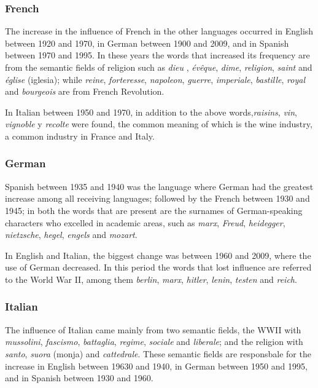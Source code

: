 \documentclass[10pt,letterpaper]{article} %
\begin{document}
	\subsubsection*{French} %
	
	The increase in the influence of French in the other languages occurred in English between 1920 and 1970, in German between 1900 and 2009, and in Spanish between 1970 and 1995. In these years the words that increased its frequency are from the semantic fields of religion such as \textit{dieu} , \textit{évêque}, \textit{dime}, \textit{religion}, \textit{saint} and \textit{église} (iglesia); while \textit{reine}, \textit{forteresse}, \textit{napoleon}, \textit{guerre}, \textit{imperiale}, \textit{bastille}, \textit{royal} and \textit{bourgeois} are from French Revolution.
	
	In Italian between 1950 and 1970, in addition to the above words,\textit{raisins}, \textit{vin}, \textit{vignoble} y \textit{recolte} were found, the common meaning of which is the wine industry, a common industry in France and Italy.
	
	\subsubsection*{German} %
	
	Spanish between 1935 and 1940 was the language where German had the greatest increase among all receiving languages; followed by the French between 1930 and 1945; in both  the words that are present are the surnames of German-speaking characters who excelled in academic areas, such as \textit{marx}, \textit{Freud}, \textit{heidegger}, \textit{nietzsche}, \textit{hegel}, \textit{engels} and \textit{mozart}.
	
	In English and Italian, the biggest change was between 1960 and 2009, where the use of German decreased. In this period the words that lost influence are referred to the World War II, among them \textit{berlin}, \textit{marx}, \textit{hitler}, \textit{lenin}, \textit{testen}  and \textit{reich}.
	\subsubsection*{Italian} %
	
	
	The influence of Italian came mainly from two semantic fields, the WWII 
	with \textit{mussolini}, \textit{fascismo}, \textit{battaglia}, \textit{regime}, \textit{sociale} and \textit{liberale}; and the religion with \textit{santo}, \textit{suora} (monja) and \textit{cattedrale}. These semantic fields are responsbale for the increase in English between 19630 and 1940, in German between 1950 and 1995, and in Spanish between 1930 and 1960.
	
\end{document}

